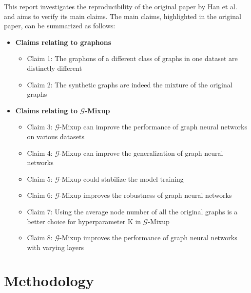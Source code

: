 This report investigates the reproducibility of the original paper by Han et al. \cite{han2022g} and aims to verify its main claims. The main claims, highlighted in the original paper, can be summarized as follows:
\begin{itemize}
    \item \textbf{Claims relating to graphons}
    \begin{itemize}
        \item Claim 1: The graphons of a different class of graphs in one dataset are distinctly different
        \item Claim 2: The synthetic graphs are indeed the mixture of the original graphs
    \end{itemize}
    \item \textbf{Claims relating to $\mathcal{G}$-Mixup}
    \begin{itemize}
        \item Claim 3: $\mathcal{G}$-Mixup can improve the performance of graph neural networks on various datasets
        \item Claim 4: $\mathcal{G}$-Mixup can improve the generalization of graph neural networks
        \item Claim 5: $\mathcal{G}$-Mixup could stabilize the model training
        \item Claim 6: $\mathcal{G}$-Mixup improves the robustness of graph neural networks
        \item Claim 7: Using the average node number of all the original graphs is a better choice for hyperparameter K in $\mathcal{G}$-Mixup
        \item Claim 8: $\mathcal{G}$-Mixup improves the performance of graph neural networks with varying layers
    \end{itemize}
\end{itemize}


\section{Methodology}

